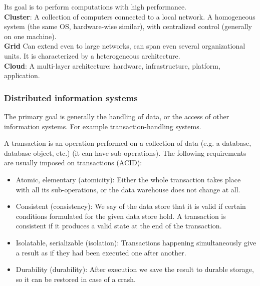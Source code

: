 \documentclass[margin=0px]{article}
\begin{document}
Its goal is to perform computations with high performance.\\

\noindent \textbf{Cluster}: A collection of computers connected to a local network. A homogeneous system (the same OS,
hardware-wise similar), with centralized control (generally on one machine).\\

\noindent \textbf{Grid} Can extend even to large networks, can span even several organizational units. It is characterized by a heterogeneous
architecture.\\

\noindent \textbf{Cloud}: A multi-layer architecture: hardware, infrastructure, platform, application.

\subsubsection{Distributed information systems}

The primary goal is generally the handling of data, or the access of other information systems. For example transaction-handling systems.

A transaction is an operation performed on a collection of data (e.g. a database, database object, etc.) (it can have sub-operations).
The following requirements are usually imposed on transactions (ACID):

\begin{itemize}
    \item	Atomic, elementary (atomicity): Either the whole transaction takes place with all its sub-operations, or the
          data warehouse does not change at all.

    \item	Consistent (consistency): We say of the data store that it is valid if certain conditions formulated for the given data store
          hold. A transaction is consistent if it produces a valid state at the end of the
          transaction.

    \item	Isolatable, serializable (isolation): Transactions happening simultaneously give a result as if they had been
          executed one after another.

    \item	Durability (durability): After execution we save the result to durable storage, so it can be
          restored in case of a crash.
\end{itemize}
\end{document}
